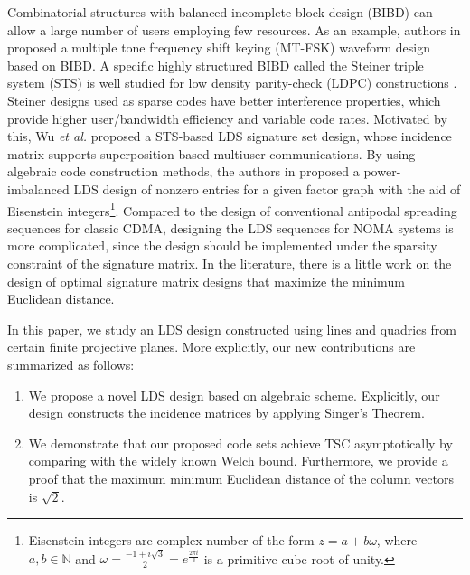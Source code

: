 \documentclass[journal,comsoc]{IEEEtran}
\begin{document}
Combinatorial structures with balanced incomplete block design (BIBD) can allow a large number of users employing few resources. As an example, authors in \cite{Claude1995} proposed a multiple tone frequency shift keying (MT-FSK) waveform design based on BIBD. A specific highly structured BIBD called the Steiner triple system (STS) is well studied for low density parity-check (LDPC) constructions \cite{Ivanov2013}. Steiner designs used as sparse codes have better interference properties, which provide higher user/bandwidth efficiency and variable code rates. Motivated by this, Wu \emph{et al.} \cite{Atkin2018} proposed a STS-based LDS signature set design, whose incidence matrix supports superposition based multiuser communications. By using algebraic code construction methods, the authors in \cite{Mheich2019, Xudong2021} proposed a power-imbalanced LDS design of nonzero entries for a given factor graph with the aid of Eisenstein integers\footnote{Eisenstein integers are complex number of the form $z = a+b \omega$, where $a,b \in \mathbb{N}$ and $\omega = \frac{-1 + i\sqrt{3}}{2} = e^{\frac{2\pi i}{3}}$ is a primitive cube root of unity.}. Compared to the design of conventional antipodal spreading sequences for classic CDMA, designing the LDS sequences for NOMA systems is more complicated, since the design should be implemented under the sparsity constraint of the signature matrix. In the literature, there is a little work on the design of optimal signature matrix designs that maximize the minimum Euclidean distance. 

In this paper, we study an LDS design constructed using lines and quadrics from certain finite projective planes. More explicitly, our new contributions are summarized as follows:
      \vspace{-0.0cm}
      \begin{enumerate}%
      \item We propose a novel LDS design based on algebraic scheme. Explicitly, our design constructs the incidence matrices by applying Singer's Theorem.   
       \item We demonstrate that our proposed code sets achieve TSC asymptotically by comparing with the widely known Welch bound. Furthermore, we provide a proof that the maximum minimum Euclidean distance of the column vectors is $\sqrt{2}$.
      \end{enumerate}
\end{document}
